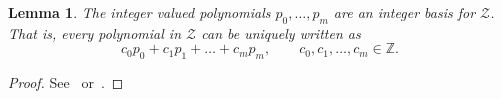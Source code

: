 \documentclass[aap]{imsart}
\newcommand{\ints}{{\mathbb Z}}
\newtheorem{lemma}{Lemma}
\begin{document}
\begin{lemma}\label{lem:intvalpol}
  The integer valued polynomials $p_0,\dots,p_m$ are an integer basis for $\mathcal{Z}$.  That is, every polynomial in $\mathcal{Z}$ can be uniquely written as
\begin{equation} \label{eq:lem_polynomial}
c_0 p_0 + c_1 p_1 + \dots + c_m p_m, \qquad c_0,c_1,\dots,c_m \in \ints.
\end{equation}
\end{lemma}
\begin{proof}
See~\citep[p. 2]{cahen_integer-valued_1997} or~\cite{McKilliam2009IndentifiabliltyAliasingPolyphase}. 
\end{proof}
\end{document}
